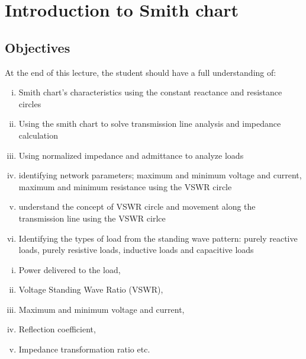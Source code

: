 \section{Introduction to Smith chart}\label{lec:lec7}
\subsection{\textbf{Objectives}}
At the end of this lecture, the student should have a full understanding of:
\begin{enumerate}[(i)]
\item Smith chart's characteristics using the constant reactance and resistance circles
\item Using the smith chart to solve transmission line analysis and impedance calculation
\item Using normalized impedance and admittance to analyze loads
\item identifying network parameters; maximum and minimum voltage and current, maximum  and minimum resistance using the VSWR circle
\item understand the concept of VSWR circle and movement along the transmission line  using the VSWR cirlce
\item Identifying the types of load from the standing wave pattern: purely reactive loads, purely resistive loads, inductive loads and capacitive loads
\end{enumerate}

\vspace{0.7cm}{Previously, we were able to derive equations for different parameters for a transmission line such as;}
\begin{enumerate}[(i)]
\item Power delivered to the load,
\item Voltage Standing Wave Ratio (VSWR),
\item Maximum and minimum voltage and current,
\item Reflection coefficient,
\item Impedance transformation ratio etc.
\end{enumerate}

